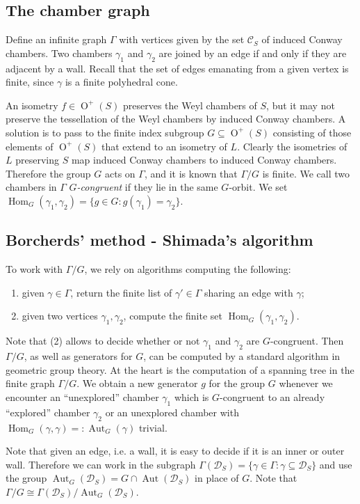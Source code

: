 \documentclass[11pt,letterpaper]{amsart}
\DeclareMathOperator{\Hom}{Hom}
\DeclareMathOperator{\Aut}{Aut}
\DeclareMathOperator{\Or}{O}
\begin{document}
\subsection{The chamber graph}
Define an infinite graph $\Gamma$ with vertices given by the set $\mathcal{C}_S$ of induced Conway chambers. Two chambers $\gamma_1$ and $\gamma_2$ are joined by an edge if and only if they are adjacent by a wall. Recall that the set of edges emanating from a given vertex is finite, since $\gamma$ is a finite polyhedral cone.

An isometry $f \in \Or^+(S)$ preserves the Weyl chambers of $S$, but it may not preserve the tessellation of the Weyl chambers by induced Conway chambers. 
A solution is to pass to the finite index subgroup $G \subseteq \Or^+(S)$ consisting of those elements of $\Or^+(S)$
that extend to an isometry of $L$. Clearly the isometries of $L$ preserving $S$ map induced Conway chambers to induced Conway chambers. Therefore the group $G$ acts on $\Gamma$, and it is known that $\Gamma/G$ is finite. 
We call two chambers in $\Gamma$ \emph{$G$-congruent} if they lie in the same $G$-orbit.
We set $\Hom_G(\gamma_1,\gamma_2)=\{g \in G : g(\gamma_1) = \gamma_2\}$.

\subsection{Borcherds' method - Shimada's algorithm}
To work with $\Gamma/G$, we rely on algorithms computing the following:
\begin{enumerate}
    \item given $\gamma \in \Gamma$, return the finite list of $\gamma'\in \Gamma$ sharing an edge with $\gamma$;
    \item given two vertices $\gamma_1,\gamma_2$, compute the finite set $\Hom_G(\gamma_1,\gamma_2)$.
\end{enumerate}
Note that (2) allows to decide whether or not $\gamma_1$ and $\gamma_2$ are $G$-congruent.
Then $\Gamma/G$, as well as generators for $G$,
can be computed by a standard algorithm in geometric group theory. 
At the heart is the computation of a spanning tree in the finite graph $\Gamma/G$. 
We obtain a new generator $g$ for the group $G$ whenever we encounter an ``unexplored'' chamber $\gamma_1$ which is $G$-congruent to an already ``explored'' chamber $\gamma_2$
or an unexplored chamber with $\Hom_G(\gamma,\gamma)=:\Aut_G(\gamma)$ trivial.

Note that given an edge, i.e. a wall, it is easy to decide if it is an inner or outer wall.
Therefore we can work in the subgraph 
$\Gamma(\mathcal{D}_S) =\{ \gamma \in \Gamma : \gamma \subseteq \mathcal{D}_S\}$ and use the group $\Aut_G(\mathcal{D}_S) = G \cap \Aut(\mathcal{D}_S)$ in place of $G$. 
Note that $\Gamma/G \cong  \Gamma(\mathcal{D}_S)/\Aut_G(\mathcal{D}_S)$.
\end{document}
